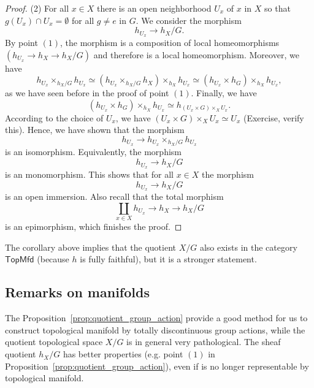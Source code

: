\documentclass{tufte-book} %
\numberwithin{dummy}{section}
\newcommand{\lrta}{\longrightarrow}
\begin{document}
\begin{proof}
(2) For all $x\in X$ there is an open neighborhood $U_x$ of $x$ in $X$ so that $g(U_x)\cap U_x=\emptyset$ for all $g\neq e$ in $G$. We consider the morphism
$$
h_{U_x}\lrta h_X/G.
$$
By point $(1)$, the morphism is a composition of local homeomorphisms $(h_{U_x}\lrta h_X\lrta h_X/G)$ and therefore is a local homeomorphism. Moreover,  we have
$$
h_{U_x}\times_{h_X/G}h_{U_x}\simeq (h_{U_x}\times_{h_X/G}h_X)\times_{h_X}h_{U_x}\simeq (h_{U_x}\times h_G)\times_{h_X}h_{U_x},
$$
as we have seen before in the proof of point $(1)$. Finally, we have
$$
(h_{U_x}\times h_G)\times_{h_X}h_{U_x}\simeq h_{(U_x\times G)\times_X U_x}.
$$
According to the choice of $U_x$, we have $(U_x\times G)\times_X U_x\simeq U_x$ (Exercise, verify this). Hence, we have shown that the morphism
$$
h_{U_x}\lrta h_{U_x}\times_{h_X/G}h_{U_x}
$$
is an isomorphism. Equivalently, the morphism
$$
h_{U_x}\lrta h_X/G
$$
is an monomorphism. This shows that for all $x\in X$ the morphism
$$
h_{U_x}\lrta h_X/G
$$
is an open immersion. Also recall that the total morphism
$$
\coprod_{x\in X}h_{U_x}\lrta h_X\lrta h_X/G
$$
is an epimorphism, which finishes the proof.
\end{proof}
The corollary above implies that the quotient $X/G$ also exists in the category $\mathsf{TopMfd}$ (because $h$ is fully faithful), but it is a stronger statement.
\subsection{Remarks on manifolds}
The Proposition~\ref{prop:quotient_group_action} provide a good method for us to construct topological manifold by totally discontinuous group actions, while the quotient topological space $X/G$ is in general very pathological. The sheaf quotient $h_X/G$ has better properties (e.g. point $(1)$ in Proposition~\ref{prop:quotient_group_action}), even if is no longer representable by topological manifold.
\end{document}
